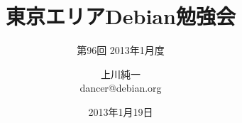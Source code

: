 




\documentclass[cjk,dvipdfmx,12pt]{beamer}
\usepackage{monthlypresentation}



\title{東京エリアDebian勉強会}
\subtitle{第96回 2013年1月度}
\author{上川純一\\dancer@debian.org}
\date{2013年1月19日}



